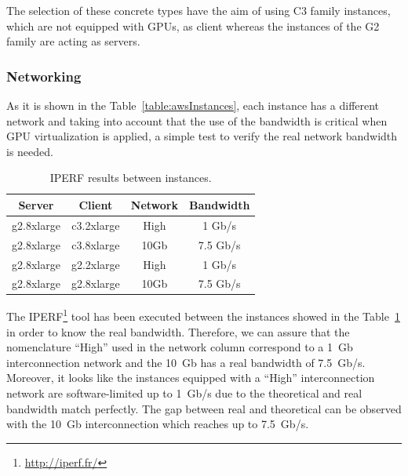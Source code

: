 \documentclass[a4paper,twoside]{article}
\begin{document}
The selection of these concrete types have the aim of using C3 family instances, which are not equipped with GPUs, as client whereas the instances of the G2 family are acting as servers.   

\subsubsection{Networking}
As it is shown in the Table~\ref{table:awsInstances}, each instance has a different 
network and taking into account that the use of the bandwidth 
is critical when GPU virtualization is applied, a simple test to verify the 
real network bandwidth is needed.

\begin{table}[htb]
\renewcommand{\arraystretch}{1.3}
\caption{IPERF results between instances.}
\label{table:iperf}
\tabcolsep=0.24cm
\begin{center}\begin{tabular}{cccc}
Server & Client & Network & Bandwidth\\ \hline \hline
g2.8xlarge & c3.2xlarge & High & 1  Gb/s\\ \hline
g2.8xlarge & c3.8xlarge & 10Gb & 7.5  Gb/s\\ \hline
g2.8xlarge & g2.2xlarge & High & 1 Gb/s\\ \hline
g2.8xlarge & g2.8xlarge & 10Gb & 7.5  Gb/s\\ \hline
\end{tabular}\end{center}\end{table}

The IPERF\footnote{\url{http://iperf.fr/}} tool has been executed between the instances showed in 
the Table~\ref{table:iperf} in order to know the real bandwidth.
Therefore, we can assure that the nomenclature ``High'' used in the 
network column correspond to a 1~Gb interconnection network and the 10~Gb has 
a real bandwidth of 7.5~Gb/s.
Moreover, it looks like the instances equipped with a ``High'' interconnection network
are software-limited up to 1~Gb/s due to the theoretical and real bandwidth 
match perfectly. The gap between real and theoretical can be observed with 
the 10~Gb interconnection which reaches up to 7.5~Gb/s.
\end{document}
